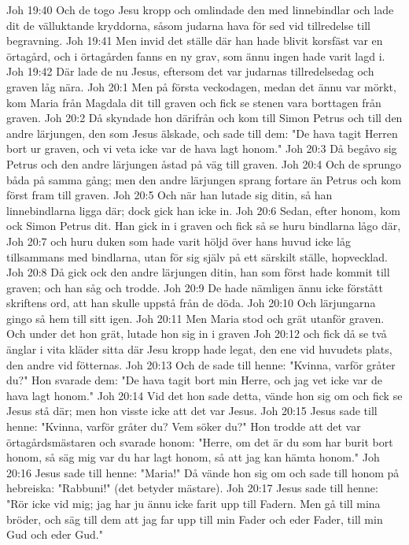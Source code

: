 Joh 19:40  Och de togo Jesu kropp och omlindade den med linnebindlar och lade dit de välluktande kryddorna, såsom judarna hava för sed vid tillredelse till begravning.
Joh 19:41  Men invid det ställe där han hade blivit korsfäst var en örtagård, och i örtagården fanns en ny grav, som ännu ingen hade varit lagd i.
Joh 19:42  Där lade de nu Jesus, eftersom det var judarnas tillredelsedag och graven låg nära.
Joh 20:1  Men på första veckodagen, medan det ännu var mörkt, kom Maria från Magdala dit till graven och fick se stenen vara borttagen från graven.
Joh 20:2  Då skyndade hon därifrån och kom till Simon Petrus och till den andre lärjungen, den som Jesus älskade, och sade till dem: "De hava tagit Herren bort ur graven, och vi veta icke var de hava lagt honom."
Joh 20:3  Då begåvo sig Petrus och den andre lärjungen åstad på väg till graven.
Joh 20:4  Och de sprungo båda på samma gång; men den andre lärjungen sprang fortare än Petrus och kom först fram till graven.
Joh 20:5  Och när han lutade sig ditin, så han linnebindlarna ligga där; dock gick han icke in.
Joh 20:6  Sedan, efter honom, kom ock Simon Petrus dit. Han gick in i graven och fick så se huru bindlarna lågo där,
Joh 20:7  och huru duken som hade varit höljd över hans huvud icke låg tillsammans med bindlarna, utan för sig själv på ett särskilt ställe, hopvecklad.
Joh 20:8  Då gick ock den andre lärjungen ditin, han som först hade kommit till graven; och han såg och trodde.
Joh 20:9  De hade nämligen ännu icke förstått skriftens ord, att han skulle uppstå från de döda.
Joh 20:10  Och lärjungarna gingo så hem till sitt igen.
Joh 20:11  Men Maria stod och grät utanför graven. Och under det hon grät, lutade hon sig in i graven
Joh 20:12  och fick då se två änglar i vita kläder sitta där Jesu kropp hade legat, den ene vid huvudets plats, den andre vid fötternas.
Joh 20:13  Och de sade till henne: "Kvinna, varför gråter du?" Hon svarade dem: "De hava tagit bort min Herre, och jag vet icke var de hava lagt honom."
Joh 20:14  Vid det hon sade detta, vände hon sig om och fick se Jesus stå där; men hon visste icke att det var Jesus.
Joh 20:15  Jesus sade till henne: "Kvinna, varför gråter du? Vem söker du?" Hon trodde att det var örtagårdsmästaren och svarade honom: "Herre, om det är du som har burit bort honom, så säg mig var du har lagt honom, så att jag kan hämta honom."
Joh 20:16  Jesus sade till henne: "Maria!" Då vände hon sig om och sade till honom på hebreiska: "Rabbuni!" (det betyder mästare).
Joh 20:17  Jesus sade till henne: "Rör icke vid mig; jag har ju ännu icke farit upp till Fadern. Men gå till mina bröder, och säg till dem att jag far upp till min Fader och eder Fader, till min Gud och eder Gud."
